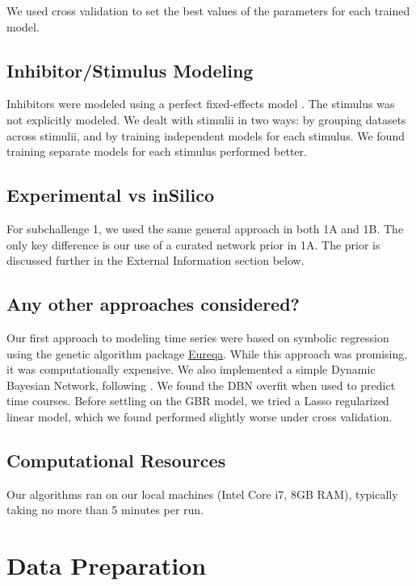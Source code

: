 \documentclass[letterpaper, 11pt]{article}
\begin{document}
We used cross validation to set the best values of the parameters for each trained model.

\subsection{Inhibitor/Stimulus Modeling}

Inhibitors were modeled using a perfect fixed-effects model \citep{Spencer2012}. The stimulus was not explicitly modeled. We dealt with stimulii in two ways: by grouping datasets across stimulii, and by training independent models for each stimulus. We found training separate models for each stimulus performed better.

\subsection{Experimental vs inSilico}

For subchallenge 1, we used the same general approach in both 1A and 1B. The only key difference is our use of a curated network prior in 1A. The prior is discussed further in the External Information section below.

\subsection{Any other approaches considered?}

Our first approach to modeling time series were based on symbolic regression using the genetic algorithm package \href{http://creativemachines.cornell.edu/eureqa}{Eureqa}. While this approach was promising, it was computationally expensive. We also implemented a simple Dynamic Bayesian Network, following \citep{Hill2012}. We found the DBN overfit when used to predict time courses. Before settling on the GBR model, we tried a Lasso regularized linear model, which we found performed slightly worse under cross validation.

\subsection{Computational Resources}

Our algorithms ran on our local machines (Intel Core i7, 8GB RAM), typically taking no more than 5 minutes per run.

\section{Data Preparation}
\end{document}
